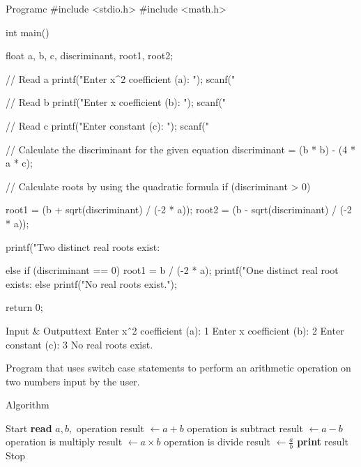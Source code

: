 \documentclass[11pt]{ipu-c}
\begin{document}
    \begin{code}
        {Program}{c}
#include <stdio.h>
#include <math.h>

int main() {
    float a, b, c, discriminant, root1, root2;

    // Read a
    printf("Enter x^2 coefficient (a): ");
    scanf("%

    // Read b
    printf("Enter x coefficient (b): ");
    scanf("%

    // Read c
    printf("Enter constant (c): ");
    scanf("%

    // Calculate the discriminant for the given equation
    discriminant = (b * b) - (4 * a * c);

    // Calculate roots by using the quadratic formula
    if (discriminant > 0) {
        root1 = (b + sqrt(discriminant) / (-2 * a));
        root2 = (b - sqrt(discriminant) / (-2 * a));

        printf("Two distinct real roots exist:\n%
    } else if (discriminant == 0) {
        root1 = b / (-2 * a);
        printf("One distinct real root exists:\n%
    } else {
        printf("No real roots exist.");
    }

    return 0;
}
    \end{code}
    \begin{code}
        {Input \& Output}{text}
Enter xˆ2 coefficient (a): 1
Enter x coefficient (b): 2
Enter constant (c): 3
No real roots exist.
    \end{code}

    {Program that uses switch case statements to perform an arithmetic operation on two numbers input by the user.}

    \begin{tabularsection}{Algorithm}
        \begin{algorithmic}[1]
            \State Start
            \State \textbf{read} $a, b,$ operation
                \State result $\gets a + b$
            \ElsIf
                    {operation is subtract}
                \State result $\gets a - b$
            \ElsIf
                    {operation is multiply}
                \State result $\gets a \times b$
            \ElsIf
                    {operation is divide}
                \State result $\gets \frac{a}{b}$
            \EndIf
            \State \textbf{print} result
            \State Stop
        \end{algorithmic}
    \end{tabularsection}
\end{document}
